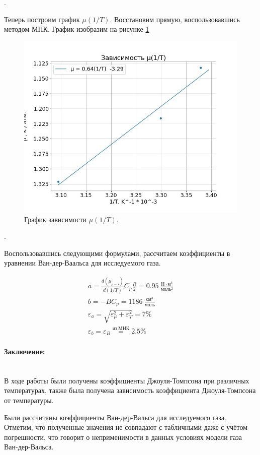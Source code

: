 \documentclass[a4paper, 12pt]{article}
\newcommand{\parag}[1]{\paragraph*{#1:}}
\newcounter{Points}
\newcommand{\point}{\arabic{Points}. \addtocounter{Points}{1}}
\begin{document}
\point Теперь построим график $\mu\left(1 / T \right)$. Восстановим прямую, воспользовавшись методом МНК. График изобразим на рисунке \ref{fig:mu_from_one_over_T}

\begin{figure}[h]
    \centering
    \includegraphics[width=\linewidth]{plot_mu_from_one_over_T.png}
    \caption{График зависимости $\mu\left(1 / T \right)$.}
    \label{fig:mu_from_one_over_T}
\end{figure}

\point Воспользовавшись следующими формулами, рассчитаем коэффициенты в уравнении Ван-дер-Ваальса для исследуемого газа.

\begin{gather*}
    a = \frac{d \left(\mu_{д-т}\right)}{d \left(1 / T\right)} C_p \frac{R}{2} = 0.95~\frac{Н \cdot м^4}{моль^2} \\
    b = -B C_p = 1186~\frac{см^3}{моль}\\
    \varepsilon_{a} = \sqrt{\varepsilon_{\mu}^2 + \varepsilon_{T}^2} = 7\% \\
    \varepsilon_{b} = \varepsilon_{B} \overset{из~МНК}{=} 2.5\%
\end{gather*}


\parag {Заключение} ~\\
В ходе работы были получены коэффициенты Джоуля-Томпсона при различных температурах, также была получена зависимость коэффициента Джоуля-Томпсона от температуры.

Были рассчитаны коэффициенты Ван-дер-Вальса для исследуемого газа. Отметим, что полученные значения не совпадают с табличными даже с учётом погрешности, что говорит о неприменимости в данных условиях модели газа Ван-дер-Вальса.
\end{document}
